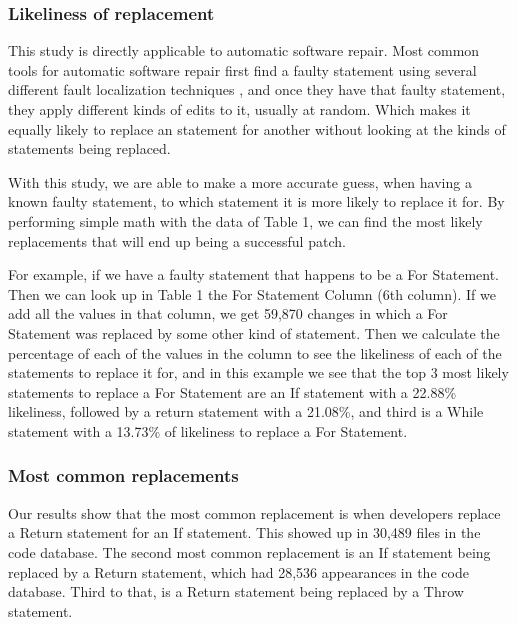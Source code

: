 \documentclass{sig-alternate-05-2015}
\begin{document}
\subsubsection{Likeliness of replacement}
This study is directly applicable to automatic software repair. Most common tools for automatic software repair \cite{dongsun}\cite{weimer}\cite{claire} first find a faulty statement using several different fault localization techniques \cite{zach}, and once they have that faulty statement, they apply different kinds of edits to it, usually at random. Which makes it equally likely to replace an statement for another without looking at the kinds of statements being replaced.

With this study, we are able to make a more accurate guess, when having a known faulty statement, to which statement it is more likely to replace it for. By performing simple math with the data of Table 1, we can find the most likely replacements that will end up being a successful patch. 

For example, if we have a faulty statement that happens to be a For Statement. Then we can look up in Table 1 the For Statement Column (6th column). If we add all the values in that column, we get 59,870 changes in which a For Statement was replaced by some other kind of statement. Then we calculate the percentage of each of the values in the column to see the likeliness of each of the statements to replace it for, and in this example we see that the top 3 most likely statements to replace a For Statement are an If statement with a 22.88\% likeliness, followed by a return statement with a 21.08\%, and third is a While statement with a 13.73\% of likeliness to replace a For Statement.


\subsubsection{Most common replacements}
Our results show that the most common replacement is when developers replace a Return statement for an If statement. This showed up in 30,489 files in the code database. The second most common replacement is an If statement being replaced by a Return statement, which had 28,536 appearances in the code database. Third to that, is a Return statement being replaced by a Throw statement.
\end{document}
